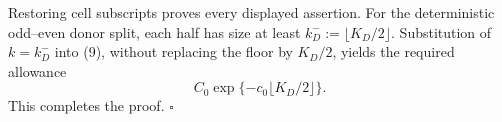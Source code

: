 Restoring cell subscripts proves every displayed assertion.  For the deterministic odd--even donor split, each half has size at least \(k_D^-:=\lfloor K_D/2\rfloor\).  Substitution of \(k=k_D^-\) into (9), without replacing the floor by \(K_D/2\), yields the required allowance
\[
 C_0\exp\{-c_0\lfloor K_D/2\rfloor\}.
\]
This completes the proof. \(\square\)
